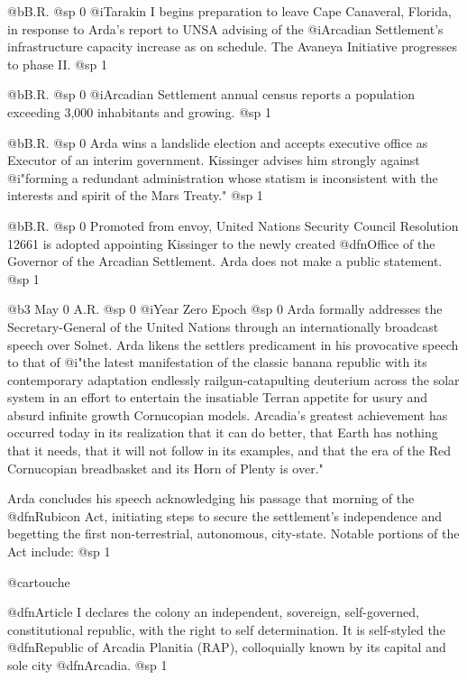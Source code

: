 @b{B.R.}
@sp 0
@i{Tarakin I} begins preparation to leave Cape Canaveral, Florida, in response to Arda's report to UNSA advising of the @i{Arcadian Settlement's} infrastructure capacity increase as on schedule. The Avaneya Initiative progresses to phase II.
@sp 1

@b{B.R.}
@sp 0
@i{Arcadian Settlement} annual census reports a population exceeding 3,000 inhabitants and growing.
@sp 1

@b{B.R.}
@sp 0
Arda wins a landslide election and accepts executive office as Executor of an interim government. Kissinger advises him strongly against @i{"forming a redundant administration whose statism is inconsistent with the interests and spirit of the Mars Treaty."}
@sp 1

@b{B.R.}
@sp 0
Promoted from envoy, United Nations Security Council Resolution 12661 is adopted appointing Kissinger to the newly created @dfn{Office of the Governor of the Arcadian Settlement}. Arda does not make a public statement.
@sp 1

@b{3 May 0 A.R.}
@sp 0
@i{Year Zero Epoch}
@sp 0
Arda formally addresses the Secretary-General of the United Nations through an internationally broadcast speech over Solnet. Arda likens the settlers predicament in his provocative speech to that of @i{"the latest manifestation of the classic banana republic with its contemporary adaptation endlessly railgun-catapulting deuterium across the solar system in an effort to entertain the insatiable Terran appetite for usury and absurd infinite growth Cornucopian models. Arcadia's greatest achievement has occurred today in its realization that it can do better, that Earth has nothing that it needs, that it will not follow in its examples, and that the era of the Red Cornucopian breadbasket and its Horn of Plenty is over."}

Arda concludes his speech acknowledging his passage that morning of the @dfn{Rubicon Act}, initiating steps to secure the settlement's independence and begetting the first non-terrestrial, autonomous, city-state. Notable portions of the Act include:
@sp 1

@cartouche
\itemize
\item
@dfn{Article I} declares the colony an independent, sovereign, self-governed, constitutional republic, with the right to self determination. It is self-styled the @dfn{Republic of Arcadia Planitia (RAP)}, colloquially known by its capital and sole city @dfn{Arcadia}.
@sp 1

